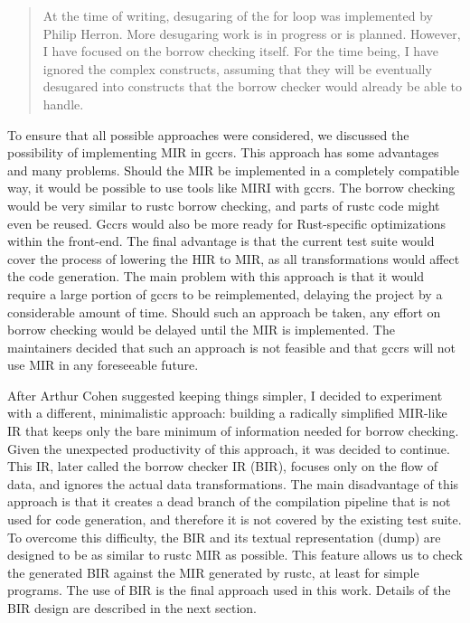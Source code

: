 \documentclass[
  11pt,
  twoside,symmetric]{report}
\begin{document}
\begin{quote}
At the time of writing, desugaring of the for loop was implemented by
Philip Herron. More desugaring work is in progress or is planned.
However, I have focused on the borrow checking itself. For the time
being, I have ignored the complex constructs, assuming that they will be
eventually desugared into constructs that the borrow checker would
already be able to handle.
\end{quote}

To ensure that all possible approaches were considered, we discussed the
possibility of implementing MIR in gccrs. This approach has some
advantages and many problems. Should the MIR be implemented in a
completely compatible way, it would be possible to use tools like MIRI
with gccrs. The borrow checking would be very similar to rustc borrow
checking, and parts of rustc code might even be reused. Gccrs would also
be more ready for Rust-specific optimizations within the front-end. The
final advantage is that the current test suite would cover the process
of lowering the HIR to MIR, as all transformations would affect the code
generation. The main problem with this approach is that it would require
a large portion of gccrs to be reimplemented, delaying the project by a
considerable amount of time. Should such an approach be taken, any
effort on borrow checking would be delayed until the MIR is implemented.
The maintainers decided that such an
approach is not feasible and that gccrs will not use MIR in any
foreseeable future.

After Arthur Cohen suggested keeping things simpler, I decided to
experiment with a different, minimalistic approach: building a radically
simplified MIR-like IR that keeps only the bare minimum of information
needed for borrow checking. Given the unexpected productivity of this
approach, it was decided to continue. This IR, later called the borrow
checker IR (BIR), focuses only on the flow of data, and ignores the
actual data transformations. The main disadvantage of this approach is
that it creates a dead branch of the compilation pipeline that is not
used for code generation, and therefore it is not covered by the
existing test suite. To overcome this difficulty, the BIR and its
textual representation (dump) are designed to be as similar to rustc MIR
as possible. This feature allows us to check the generated BIR against
the MIR generated by rustc, at least for simple programs. The use of BIR
is the final approach used in this work. Details of the BIR design are
described in the next section.
\end{document}
